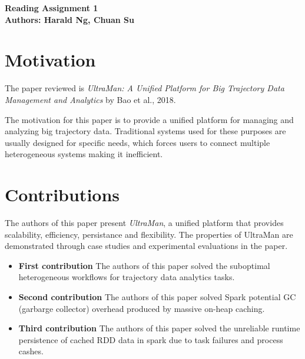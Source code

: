 \documentclass[10pt]{proc}
\begin{document}
\large{\textbf{Reading Assignment 1}}\\

\large{\textbf{Authors: Harald Ng, Chuan Su}}\\

\section{Motivation}
The paper reviewed is \textit{UltraMan: A Unified Platform for Big Trajectory Data Management and Analytics} by Bao et al., 2018.

The motivation for this paper is to provide a unified platform for managing and analyzing big trajectory data. Traditional systems used for these purposes are usually designed for specific needs, which forces users to connect multiple heterogeneous systems making it inefficient.

\section{Contributions}
The authors of this paper present \textit{UltraMan}, a unified platform that provides scalability, efficiency, persistance and flexibility. The properties of UltraMan are demonstrated through case studies and experimental evaluations in the paper.

\begin{itemize}
\item \textbf{First contribution}
  The authors of this paper solved the suboptimal heterogeneous workflows for trajectory data analytics tasks.
\item \textbf{Second contribution}
  The authors of this paper solved Spark potential GC (garbarge collector) overhead produced by massive on-heap caching.
\item \textbf{Third contribution}
  The authors of this paper solved the unreliable runtime persistence of cached RDD data in spark due to task failures and process cashes.
\end{itemize}
\end{document}
